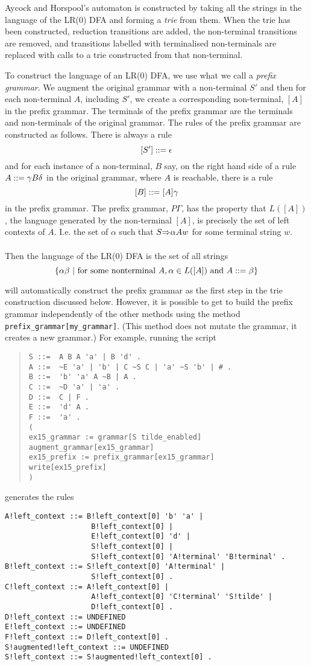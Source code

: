 Aycock and Horspool's automaton is constructed by taking all the
strings in the language of the LR(0) DFA and forming a {\em
trie} from them. When the trie has been constructed, reduction
transitions are added, the non-terminal transitions are removed, and
transitions labelled with terminalised non-terminals are replaced with
calls to a trie constructed from that non-terminal.

To construct the language of an LR(0) DFA, we use what we call a
{\em prefix grammar}. We augment the original grammar with a
non-terminal $S'$ and then for each non-terminal $A$, including $S'$, we
create a corresponding non-terminal, $[A]$ in the prefix grammar.
The terminals of the prefix grammar are the terminals and
non-terminals of the original grammar. The rules of the prefix grammar
are constructed as follows. There is always a rule
$$
[S']::= \epsilon
$$
and for each instance of a non-terminal, $B$ say, on the right hand side of a
rule $A::= \gamma B\delta$ in the original grammar, where $A$ is 
reachable, there is a rule
$$
[B]::= [A]\gamma
$$
in the prefix grammar. The prefix grammar, $P\Gamma$, has the property
that $L([A])$, the language generated by the non-terminal $[A]$, is
precisely the set of left contexts of $A$. I.e. the set of $\alpha$ such
that $S{\mathop{\Rightarrow}\limits_{}}\alpha A w$ for some terminal string $w$.

Then the language of the LR(0) DFA is the set of all strings
$$
\{\alpha\beta\ |\ {\rm for\ some\ nonterminal\ } A,
\alpha\in L([A]) {\rm \ and\ } A::=\beta\}
$$

\gtb will automatically construct the prefix grammar as the first step
in the trie construction discussed below. However, it is possible to
get \gtb to build the prefix grammar independently of the other
methods using the method \verb+prefix_grammar[my_grammar]+.
(This method does not mutate the grammar, it creates a new
grammar.) For example, running the script
\begin{quote}
\begin{verbatim}
S ::=  A B A 'a' | B 'd' .
A ::=  ~E 'a' | 'b' | C ~S C | 'a' ~S 'b' | # .
B ::=  'b' 'a' A ~B | A .
C ::=  ~D 'a' | 'a' .
D ::=  C | F .
E ::=  'd' A .
F ::=  'a' .
(
ex15_grammar := grammar[S tilde_enabled]
augment_grammar[ex15_grammar]
ex15_prefix := prefix_grammar[ex15_grammar]
write[ex15_prefix]
)
\end{verbatim}
\end{quote}
generates the rules
{\small
\begin{verbatim}
A!left_context ::= B!left_context[0] 'b' 'a' |
                    B!left_context[0] |
                    E!left_context[0] 'd' |
                    S!left_context[0] |
                    S!left_context[0] 'A!terminal' 'B!terminal' .
B!left_context ::= S!left_context[0] 'A!terminal' |
                    S!left_context[0] .
C!left_context ::= A!left_context[0] |
                    A!left_context[0] 'C!terminal' 'S!tilde' |
                    D!left_context[0] .
D!left_context ::= UNDEFINED
E!left_context ::= UNDEFINED
F!left_context ::= D!left_context[0] .
S!augmented!left_context ::= UNDEFINED
S!left_context ::= S!augmented!left_context[0] .
\end{verbatim}%
}

